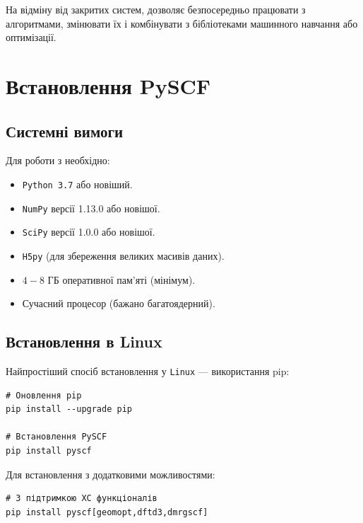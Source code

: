 На відміну від закритих систем, \PySCF{} дозволяє безпосередньо працювати з алгоритмами, змінювати їх і комбінувати з бібліотеками машинного навчання або оптимізації.


\section{Встановлення PySCF}

\subsection{Системні вимоги}

Для роботи з \PySCF{} необхідно:
\begin{itemize}
    \item \texttt{Python 3.7} або новіший.
    \item \texttt{NumPy} версії 1.13.0 або новішої.
    \item \texttt{SciPy} версії 1.0.0 або новішої.
    \item \texttt{H5py} (для збереження великих масивів даних).
    \item $4-8$ ГБ оперативної пам'яті (мінімум).
    \item Сучасний процесор (бажано багатоядерний).
\end{itemize}

\subsection{Встановлення в Linux}

Найпростіший спосіб встановлення \PySCF{} у \texttt{Linux} --- використання pip:

\begin{verbatim}
# Оновлення pip
pip install --upgrade pip

# Встановлення PySCF
pip install pyscf
\end{verbatim}

Для встановлення з додатковими можливостями:

\begin{verbatim}
# З підтримкою XC функціоналів
pip install pyscf[geomopt,dftd3,dmrgscf]
\end{verbatim}

